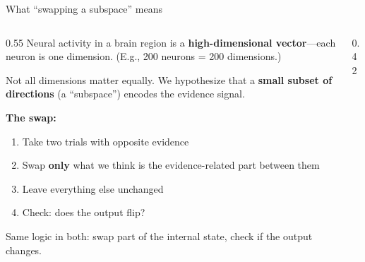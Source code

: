 \documentclass[aspectratio=169,11pt]{beamer}
\begin{document}
\begin{frame}{What ``swapping a subspace'' means}
\begin{columns}[T]
\begin{column}{0.55\textwidth}
{\small Neural activity in a brain region is a \textbf{high-dimensional vector}---each neuron is one dimension. (E.g., 200 neurons = 200 dimensions.)}

\vspace{0.3em}
{\small Not all dimensions matter equally. We hypothesize that a \textbf{small subset of directions} (a ``subspace'') encodes the evidence signal.}

\vspace{0.3em}
{\small \textbf{The swap:}}
\begin{enumerate}\setlength\itemsep{2pt}
  \item {\small Take two trials with opposite evidence}
  \item {\small Swap \textbf{only} what we think is the evidence-related part between them}
  \item {\small Leave everything else unchanged}
  \item {\small Check: does the output flip?}
\end{enumerate}

\vspace{0.3em}
{\small Same logic in both: swap part of the internal state, check if the output changes.}
\end{column}
\begin{column}{0.42\textwidth}
\centering
{}
\end{column}
\end{columns}
\end{frame}
\end{document}
